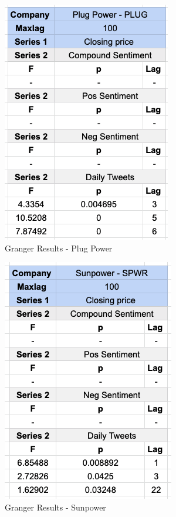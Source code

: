 \documentclass[sigconf, nonacm]{acmart}
\begin{document}
\begin{figure}[H]
  \centering
  \includegraphics[width=0.7\linewidth]{granger_results/granger_plug.png}
  \caption{Granger Results - Plug Power}
  \label{granger_plug}
\end{figure}

\begin{figure}[H]
  \centering
  \includegraphics[width=0.7\linewidth]{granger_results/granger_sunpower.png}
  \caption{Granger Results - Sunpower}
  \label{granger_sunpower}
\end{figure}
\end{document}
